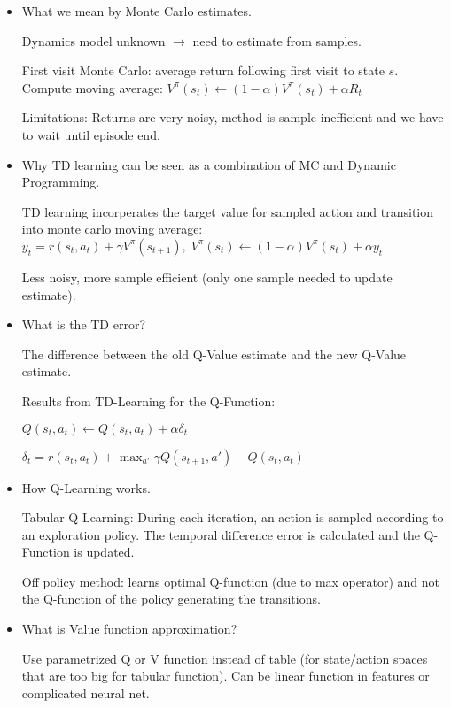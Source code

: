 \documentclass[11pt]{scrartcl}
\begin{document}
\begin{itemize}
    \item What we mean by Monte Carlo estimates.
    
    Dynamics model unknown $\rightarrow$ need to estimate from samples.

    First visit Monte Carlo: average return following first visit to state $s$.
    Compute moving average: $V^\pi(s_t) \leftarrow (1-\alpha)V^\pi(s_t) + \alpha R_t$

    Limitations: Returns are very noisy, method is sample inefficient and we have to 
    wait until episode end.

    \item Why TD learning can be seen as a combination of MC and Dynamic Programming.

    TD learning incorperates the target value for sampled action and transition into monte 
    carlo moving average:
    $y_t = r(s_t,a_t) + \gamma V^\pi(s_{t+1}), \; V^\pi(s_t) \leftarrow (1-\alpha)V^\pi(s_t) + \alpha y_t$

    Less noisy, more sample efficient (only one sample needed to update estimate).

    \item What is the TD error?
    
    The difference between the old Q-Value estimate and the new Q-Value estimate.
    
    Results from TD-Learning for the Q-Function:
    
    $Q(s_t,a_t) \leftarrow Q(s_t,a_t) + \alpha \delta_t$
    
    $\delta_t = r(s_t,a_t) + \max_{a'}\gamma Q(s_{t+1},a') - Q(s_t,a_t)$

    \item How Q-Learning works.
    
    Tabular Q-Learning: During each iteration, an action is sampled according to an exploration 
    policy. The temporal difference error is calculated and the Q-Function is updated.

    Off policy method: learns optimal Q-function (due to max operator) and not the Q-function
    of the policy generating the transitions.

    \item What is Value function approximation?
    
    Use parametrized Q or V function instead of table (for state/action spaces that are too big
    for tabular function). Can be linear function in features or complicated neural net.


\end{itemize}
\end{document}
